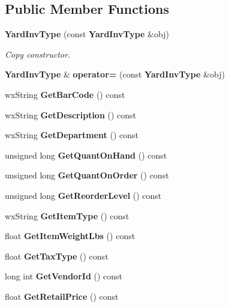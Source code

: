 \subsection*{Public Member Functions}
\begin{CompactItemize}
\item 
{\bf Yard\-Inv\-Type} (const {\bf Yard\-Inv\-Type} \&obj)\label{classYardInvType_a1}

\begin{CompactList}\small\item\em Copy constructor. \item\end{CompactList}\item 
{\bf Yard\-Inv\-Type} \& {\bf operator=} (const {\bf Yard\-Inv\-Type} \&obj)\label{classYardInvType_a2}

\item 
wx\-String {\bf Get\-Bar\-Code} () const \label{classYardInvType_a3}

\item 
wx\-String {\bf Get\-Description} () const \label{classYardInvType_a4}

\item 
wx\-String {\bf Get\-Department} () const \label{classYardInvType_a5}

\item 
unsigned long {\bf Get\-Quant\-On\-Hand} () const \label{classYardInvType_a6}

\item 
unsigned long {\bf Get\-Quant\-On\-Order} () const \label{classYardInvType_a7}

\item 
unsigned long {\bf Get\-Reorder\-Level} () const \label{classYardInvType_a8}

\item 
wx\-String {\bf Get\-Item\-Type} () const \label{classYardInvType_a9}

\item 
float {\bf Get\-Item\-Weight\-Lbs} () const \label{classYardInvType_a10}

\item 
float {\bf Get\-Tax\-Type} () const \label{classYardInvType_a11}

\item 
long int {\bf Get\-Vendor\-Id} () const \label{classYardInvType_a12}

\item 
float {\bf Get\-Retail\-Price} () const \label{classYardInvType_a13}


\end{CompactItemize}
